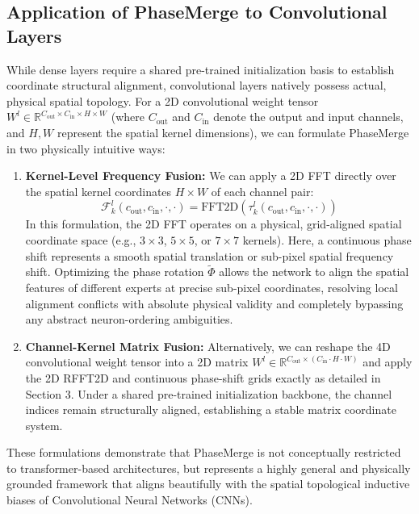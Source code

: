 \documentclass{article}
\theoremstyle{plain}
\theoremstyle{definition}
\theoremstyle{remark}
\begin{document}
\subsection{Application of PhaseMerge to Convolutional Layers}
\label{sec:app_convolutional}

While dense layers require a shared pre-trained initialization basis to establish coordinate structural alignment, convolutional layers natively possess actual, physical spatial topology. For a 2D convolutional weight tensor $W^l \in \mathbb{R}^{C_{\text{out}} \times C_{\text{in}} \times H \times W}$ (where $C_{\text{out}}$ and $C_{\text{in}}$ denote the output and input channels, and $H, W$ represent the spatial kernel dimensions), we can formulate PhaseMerge in two physically intuitive ways:

\begin{enumerate}
    \item \textbf{Kernel-Level Frequency Fusion:} We can apply a 2D FFT directly over the spatial kernel coordinates $H \times W$ of each channel pair:
    \begin{equation}
        \mathcal{F}^l_k(c_{\text{out}}, c_{\text{in}}, \cdot, \cdot) = \text{FFT2D}\left( \tau^l_k(c_{\text{out}}, c_{\text{in}}, \cdot, \cdot) \right)
    \end{equation}
    In this formulation, the 2D FFT operates on a physical, grid-aligned spatial coordinate space (e.g., $3 \times 3$, $5 \times 5$, or $7 \times 7$ kernels). Here, a continuous phase shift represents a smooth spatial translation or sub-pixel spatial frequency shift. Optimizing the phase rotation $\tilde{\Phi}$ allows the network to align the spatial features of different experts at precise sub-pixel coordinates, resolving local alignment conflicts with absolute physical validity and completely bypassing any abstract neuron-ordering ambiguities.
    \item \textbf{Channel-Kernel Matrix Fusion:} Alternatively, we can reshape the 4D convolutional weight tensor into a 2D matrix $W^l \in \mathbb{R}^{C_{\text{out}} \times (C_{\text{in}} \cdot H \cdot W)}$ and apply the 2D RFFT2D and continuous phase-shift grids exactly as detailed in Section 3. Under a shared pre-trained initialization backbone, the channel indices remain structurally aligned, establishing a stable matrix coordinate system.
\end{enumerate}

These formulations demonstrate that PhaseMerge is not conceptually restricted to transformer-based architectures, but represents a highly general and physically grounded framework that aligns beautifully with the spatial topological inductive biases of Convolutional Neural Networks (CNNs).
\end{document}

